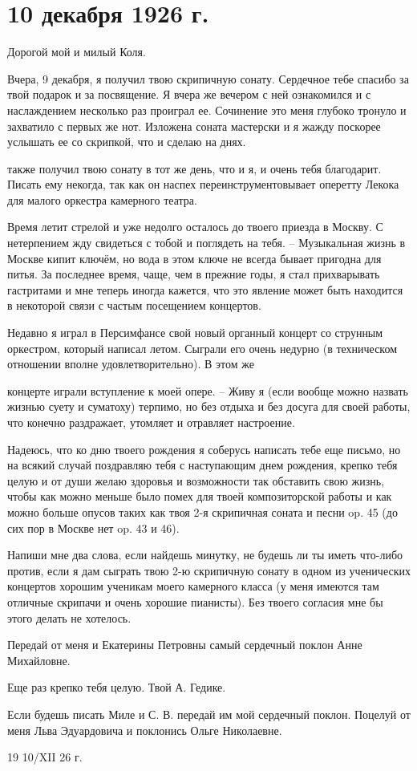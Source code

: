 \section{10 декабря 1926 г.}


Дорогой мой и милый Коля.

Вчера, 9 декабря, я получил твою скрипичную сонату. Сердечное тебе спасибо за
твой подарок и за посвящение. Я вчера же вечером с ней ознакомился и с
наслаждением несколько раз проиграл ее.
Сочинение это меня глубоко тронуло и захватило с первых же нот. Изложена соната
мастерски и я жажду поскорее услышать ее со скрипкой, что и сделаю на днях.

 также получил твою сонату в тот же день, что и я, и очень тебя
благодарит. Писать ему некогда, так как он наспех переинструментовывает оперетту
Лекока для малого оркестра камерного театра.


Время летит стрелой и уже недолго осталось до твоего приезда в Москву. С
нетерпением жду свидеться с тобой и поглядеть на тебя. -- Музыкальная жизнь в
Москве кипит ключём, но вода в этом ключе не всегда бывает пригодна для питья.
За последнее время, чаще, чем в прежние годы, я стал прихварывать гастритами и
мне теперь иногда кажется, что это явление может быть находится в некоторой
связи с частым посещением концертов.

Недавно я играл в Персимфансе свой новый органный концерт со струнным
оркестром, который написал летом. Сыграли его очень недурно (в техническом
отношении вполне удовлетворительно). В этом же


\noindent
концерте играли вступление к моей опере. -- Живу я (если вообще можно назвать
жизнью суету и суматоху) терпимо, но без отдыха и без досуга для своей работы,
что конечно раздражает, утомляет и отравляет настроение.

Надеюсь, что ко дню твоего рождения я соберусь написать тебе еще письмо, но на
всякий случай поздравляю тебя с наступающим днем рождения, крепко тебя целую и
от души желаю здоровья и возможности так обставить свою жизнь, чтобы как можно
меньше было помех для твоей композиторской работы и как можно больше опусов
таких как твоя 2-я скрипичная соната и песни op. 45 (до сих пор в Москве нет
op. 43 и 46).


Напиши мне два слова, если найдешь минутку, не будешь ли ты иметь что-либо
против, если я дам сыграть твою 2-ю скрипичную сонату в одном из ученических
концертов хорошим ученикам моего камерного класса (у меня имеются там отличные
скрипачи и очень хорошие пианисты). Без твоего согласия мне бы этого делать не
хотелось.

Передай от меня и Екатерины Петровны самый сердечный поклон Анне Михайловне.

Еще раз крепко тебя целую. Твой А. Гедике.

Если будешь писать Миле и С. В.  передай им мой сердечный
поклон. Поцелуй от меня Льва Эдуардовича и поклонись Ольге Николаевне.

19 10/XII 26 г.
